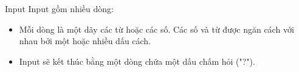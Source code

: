 Input  
Input gồm nhiều dòng:  
\begin{itemize}
	\item     Mỗi dòng là một dãy các từ hoặc các số. Các số và từ được ngăn cách với nhau bởi một hoặc nhiều dấu cách.   
	\item     Input sẽ kết thúc bằng một dòng chứa một dấu chấm hỏi ("?").   
\end{itemize}